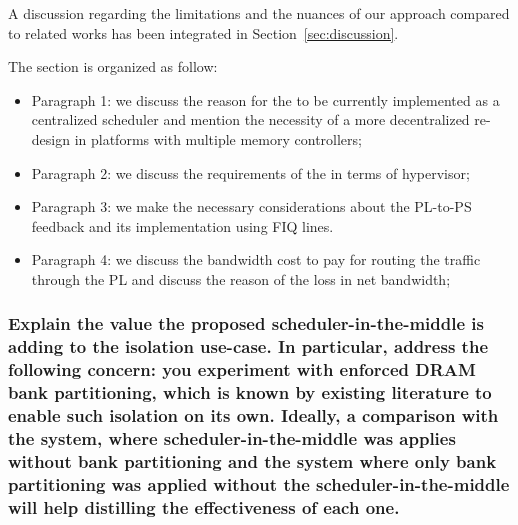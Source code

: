            A discussion regarding the limitations and the nuances of
            our approach compared to related works has been integrated
            in Section~\ref{sec:discussion}.

            The section is organized as follow:
            \begin{itemize}
                \item Paragraph 1: we discuss the reason for the \schim
                to be currently implemented as a centralized scheduler
                and mention the necessity of a more decentralized
                re-design in platforms with multiple memory
                controllers;

                \item Paragraph 2: we discuss the requirements of the \schim
                in terms of hypervisor;

                \item Paragraph 3: we make the necessary
                considerations about the PL-to-PS feedback and its
                implementation using FIQ lines.

                \item Paragraph 4: we discuss the bandwidth cost to
                pay for routing the traffic through the PL and discuss
                the reason of the loss in net bandwidth;
           \end{itemize}

        \subsubsection{Explain the value the proposed
        scheduler-in-the-middle is adding to the isolation
        use-case. In particular, address the following concern: you
        experiment with enforced DRAM bank partitioning, which is
        known by existing literature to enable such isolation on its
        own. Ideally, a comparison with the system, where
        scheduler-in-the-middle was applies without bank partitioning
        and the system where only bank partitioning was applied
        without the scheduler-in-the-middle will help distilling the
        effectiveness of each one.}

